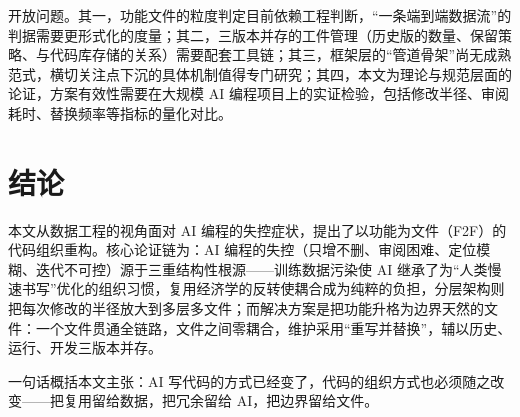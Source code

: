 \documentclass[11pt,a4paper]{ctexart}
\begin{document}
开放问题。其一，功能文件的粒度判定目前依赖工程判断，“一条端到端数据流”的判据需要更形式化的度量；其二，三版本并存的工件管理（历史版的数量、保留策略、与代码库存储的关系）需要配套工具链；其三，框架层的“管道骨架”尚无成熟范式，横切关注点下沉的具体机制值得专门研究；其四，本文为理论与规范层面的论证，方案有效性需要在大规模 AI 编程项目上的实证检验，包括修改半径、审阅耗时、替换频率等指标的量化对比。

\section{结论}
本文从数据工程的视角面对 AI 编程的失控症状，提出了以功能为文件（F2F）的代码组织重构。核心论证链为：AI 编程的失控（只增不删、审阅困难、定位模糊、迭代不可控）源于三重结构性根源——训练数据污染使 AI 继承了为“人类慢速书写”优化的组织习惯，复用经济学的反转使耦合成为纯粹的负担，分层架构则把每次修改的半径放大到多层多文件；而解决方案是把功能升格为边界天然的文件：一个文件贯通全链路，文件之间零耦合，维护采用“重写并替换”，辅以历史、运行、开发三版本并存。

一句话概括本文主张：AI 写代码的方式已经变了，代码的组织方式也必须随之改变——把复用留给数据，把冗余留给 AI，把边界留给文件。

\clearpage


\end{document}
